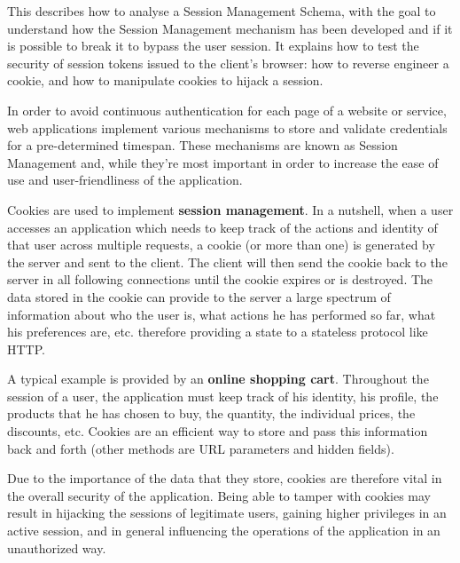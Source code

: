 		This describes how to analyse a Session Management Schema, with the goal to understand how 
		the Session Management mechanism has been developed and if it is possible to break it to 
		bypass the user session. It explains how to test the security of session tokens issued to 
		the client's browser: how to reverse engineer a cookie, and how to manipulate cookies
		to hijack a session.

		In order to avoid continuous authentication for each page of a website or service, web applications implement various mechanisms to store and validate credentials for a pre-determined timespan.
		These mechanisms are known as Session Management and, while they're most important in order to increase the ease of use and user-friendliness of the application.

		Cookies are used to implement {\bf session management}. In a nutshell, when a user accesses an 
		application which needs to keep track of the actions and identity of that user across multiple
		requests, a cookie (or more than one) is generated by the server and sent to the client. 
		The client will then send the cookie back to the server in all following connections until 
		the cookie expires or is destroyed. The data stored in the cookie can provide to the server
		a large spectrum of information about who the user is, what actions he has performed so far, 
		what his preferences are, etc. therefore providing a state to a {stateless protocol like HTTP}.
		
		A typical example is provided by an {\bf online shopping cart}. Throughout the session of a user, 
		the application must keep track of his identity, his profile, the products that he has chosen to 
		buy, the quantity, the individual prices, the discounts, etc.
		Cookies are an efficient way to store and pass this information back and forth (other methods are 
		URL parameters and hidden fields).
		
		Due to the importance of the data that they store, cookies are therefore vital in the overall 
		security of the application. Being able to tamper with cookies may result in hijacking the 
		sessions of legitimate users, gaining higher privileges in an active session, and in general
		influencing the operations of the application in an unauthorized way. 

